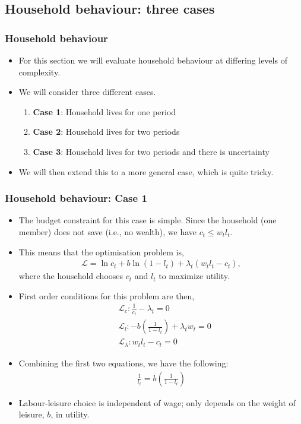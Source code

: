 \documentclass[10pt, handout]{beamer} %
\begin{document}
\subsection{Household behaviour: three cases}

\begin{frame}
\frametitle{Household behaviour}
\begin{itemize}[<+->]
\item For this section we will evaluate household behaviour at differing levels of complexity.
\vspace{3mm}
\item We will consider three different cases.
\begin{enumerate}
\item \textbf{Case 1}: Household lives for one period
\item \textbf{Case 2}: Household lives for two periods
\item \textbf{Case 3}: Household lives for two periods and there is uncertainty
\end{enumerate}
\vspace{3mm}
\item We will then extend this to a more general case, which is quite tricky.
\end{itemize}
\end{frame}


\begin{frame}
\frametitle{Household behaviour: Case 1}
\small
\begin{itemize}[<+->]
\item The budget constraint for this case is simple. Since the household (one member) does not save (i.e., no wealth), we have $c_{t} \leq w_{t}l_{t}$.
\item This means that the optimisation problem is,
\begin{align*}
\mathcal{L} = \ln{c_{t}} + b\ln(1-l_{t}) + \lambda_{t}(w_{t}l_{t} - c_{t}) ,
\end{align*}
where the household chooses $c_{t}$ and $l_{t}$ to maximize utility.
\item First order conditions for this problem are then,
\begin{align*}
&\mathcal{L}_{c} : \frac{1}{c_{t}} - \lambda_{t} = 0 \\
&\mathcal{L}_{l} : -b\left(\frac{1}{1 - l_{t}}\right) + \lambda_{t}w_{t} = 0 \\
&\mathcal{L}_{\lambda} : w_{t}l_{t} - c_{t} = 0
\end{align*}
\item Combining the first two equations, we have the following:
\begin{align*}
\frac{1}{l_{t}} = b\left(\frac{1}{1 - l_{t}}\right)
\end{align*}
\item Labour-leisure choice is independent of wage; only depends on the weight of leisure, $b$, in utility.
\end{itemize}
\end{frame}
\end{document}
